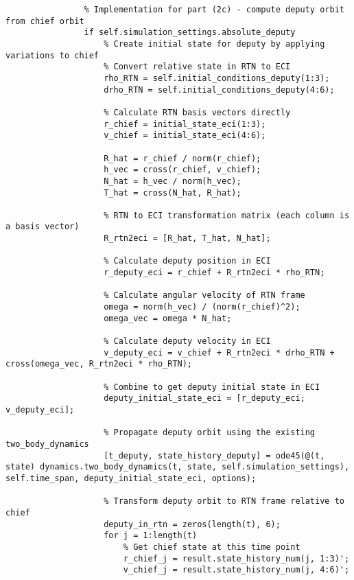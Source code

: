 \begin{lstlisting}
                % Implementation for part (2c) - compute deputy orbit from chief orbit
                if self.simulation_settings.absolute_deputy
                    % Create initial state for deputy by applying variations to chief
                    % Convert relative state in RTN to ECI
                    rho_RTN = self.initial_conditions_deputy(1:3);
                    drho_RTN = self.initial_conditions_deputy(4:6);
                    
                    % Calculate RTN basis vectors directly
                    r_chief = initial_state_eci(1:3);
                    v_chief = initial_state_eci(4:6);
                    
                    R_hat = r_chief / norm(r_chief);
                    h_vec = cross(r_chief, v_chief);
                    N_hat = h_vec / norm(h_vec);
                    T_hat = cross(N_hat, R_hat);
                    
                    % RTN to ECI transformation matrix (each column is a basis vector)
                    R_rtn2eci = [R_hat, T_hat, N_hat];
                    
                    % Calculate deputy position in ECI
                    r_deputy_eci = r_chief + R_rtn2eci * rho_RTN;
                    
                    % Calculate angular velocity of RTN frame
                    omega = norm(h_vec) / (norm(r_chief)^2);
                    omega_vec = omega * N_hat;
                    
                    % Calculate deputy velocity in ECI
                    v_deputy_eci = v_chief + R_rtn2eci * drho_RTN + cross(omega_vec, R_rtn2eci * rho_RTN);
                    
                    % Combine to get deputy initial state in ECI
                    deputy_initial_state_eci = [r_deputy_eci; v_deputy_eci];
                    
                    % Propagate deputy orbit using the existing two_body_dynamics
                    [t_deputy, state_history_deputy] = ode45(@(t, state) dynamics.two_body_dynamics(t, state, self.simulation_settings), self.time_span, deputy_initial_state_eci, options);
                    
                    % Transform deputy orbit to RTN frame relative to chief
                    deputy_in_rtn = zeros(length(t), 6);
                    for j = 1:length(t)
                        % Get chief state at this time point
                        r_chief_j = result.state_history_num(j, 1:3)';
                        v_chief_j = result.state_history_num(j, 4:6)';
                        

\end{lstlisting}

